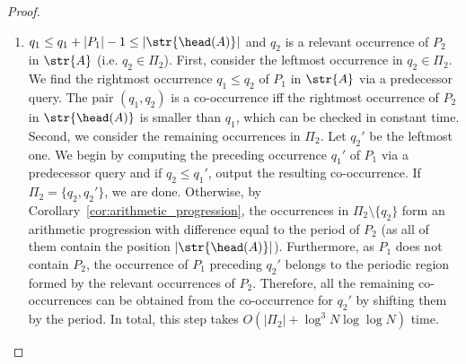 \begin{proof}
\begin{enumerate}
\item $q_1 \le q_1+|P_1|-1 \le |\str{\head(A)}|$ and $q_2$ is a relevant occurrence of $P_2$ in $\str{A}$ (i.e. $q_2 \in \Pi_2$). First, consider the leftmost occurrence in $q_2 \in \Pi_2$. We find the rightmost occurrence $q_1 \le q_2$  of $P_1$ in $\str{A}$ via a predecessor query. The pair $(q_1,q_2)$  is a co-occurrence iff the rightmost occurrence of $P_2$ in $\str{\head(A)}$ is smaller than $q_1$, which can be checked in constant time. Second, we consider the remaining occurrences in $\Pi_2$. Let $q_2'$ be the leftmost one. We begin by computing the preceding occurrence $q_1'$ of $P_1$ via a predecessor query and if $q_2 \le q_1'$, output the resulting co-occurrence. If $\Pi_2 = \{q_2, q_2'\}$, we are done. Otherwise, by Corollary~\ref{cor:arithmetic_progression}, the occurrences in $\Pi_2 \setminus \{q_2\}$ form an arithmetic progression with difference equal to the period of $P_2$ (as all of them contain the position $|\str{\head(A)}|$). Furthermore, as $P_1$ does not contain $P_2$, the occurrence of $P_1$ preceding $q_2'$ belongs to the periodic region formed by the relevant occurrences of $P_2$. Therefore, all the remaining co-occurrences can be obtained from the co-occurrence for $q_2'$ by shifting them by the period. In total, this step takes $O(|\Pi_2| + \log^{3} N\log\log N)$ time.
\end{enumerate}
\end{proof}

